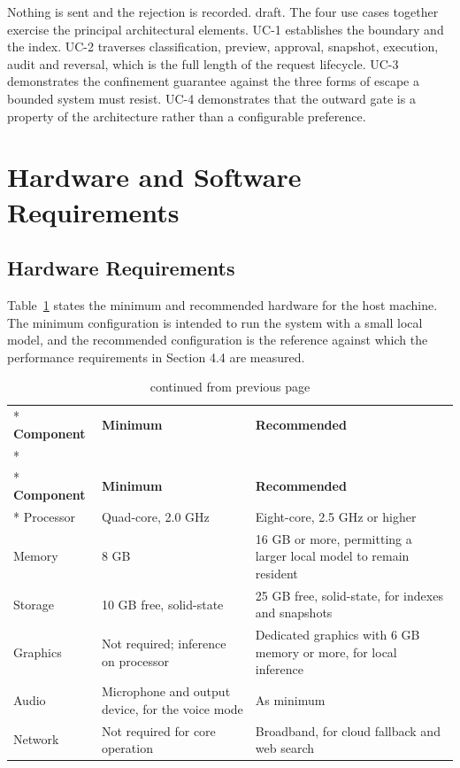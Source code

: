 \documentclass{FastFyp}
\begin{document}
Nothing is sent and the rejection is recorded. draft. The four use cases together exercise the principal architectural elements. UC-1 establishes the boundary and the index. UC-2 traverses classification, preview, approval, snapshot, execution, audit and reversal, which is the full length of the request lifecycle. UC-3 demonstrates the confinement guarantee against the three forms of escape a bounded system must resist. UC-4 demonstrates that the outward gate is a property of the architecture rather than a configurable preference.

\section{Hardware and Software Requirements}
\subsection{Hardware Requirements}
Table~\ref{tab:hardware} states the minimum and recommended hardware for the host machine. The minimum configuration is intended to run the system with a small local model, and the recommended configuration is the reference against which the performance requirements in Section 4.4 are measured.

{
\begin{longtable}{|p{3.4cm}|p{4.8cm}|p{5.4cm}|}
\caption{Host hardware requirements.}\label{tab:hardware}\\*
\hline
\textbf{Component} & \textbf{Minimum} & \textbf{Recommended} \\*
\hline
\endfirsthead
\caption[]{continued from previous page}\\*
\hline
\textbf{Component} & \textbf{Minimum} & \textbf{Recommended} \\*
\hline
\endhead
\hline
Processor & Quad-core, 2.0 GHz & Eight-core, 2.5 GHz or higher \\
\hline
Memory & 8 GB & 16 GB or more, permitting a larger local model to remain resident \\
\hline
Storage & 10 GB free, solid-state & 25 GB free, solid-state, for indexes and snapshots \\
\hline
Graphics & Not required; inference on processor & Dedicated graphics with 6 GB memory or more, for local inference \\
\hline
Audio & Microphone and output device, for the voice mode & As minimum \\
\hline
Network & Not required for core operation & Broadband, for cloud fallback and web search \\
\hline
\end{longtable}
}
\end{document}
